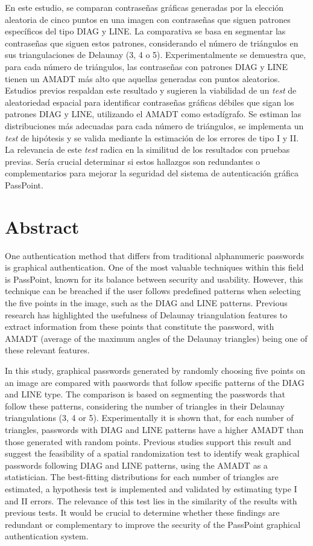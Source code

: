 \documentclass[12pt]{report}
\begin{document}
	En este estudio, se comparan contraseñas gráficas generadas por la elección aleatoria de cinco puntos en una imagen con contraseñas que siguen patrones específicos del tipo DIAG y LINE. La comparativa se basa en segmentar las contraseñas que siguen estos patrones, considerando el número de triángulos en sus triangulaciones de Delaunay (3, 4 o 5). Experimentalmente se demuestra que, para cada número de triángulos, las contraseñas con patrones DIAG y LINE tienen un AMADT más alto que aquellas generadas con puntos aleatorios. Estudios previos respaldan este resultado y sugieren la viabilidad de un \textit{test} de aleatoriedad espacial para identificar contraseñas gráficas débiles que sigan los patrones DIAG y LINE, utilizando el AMADT como estadígrafo. Se estiman las distribuciones más adecuadas para cada número de triángulos, se implementa un \textit{test} de hipótesis y se valida mediante la estimación de los errores de tipo I y II. La relevancia de este \textit{test} radica en la similitud de los resultados con pruebas previas. Sería crucial determinar si estos hallazgos son redundantes o complementarios para mejorar la seguridad del sistema de autenticación gráfica PassPoint.


\chapter*{Abstract}
\hypertarget{Abstract}{}
	
	One authentication method that differs from traditional alphanumeric passwords is graphical authentication. One of the most valuable techniques within this field is PassPoint, known for its balance between security and usability. However, this technique can be breached if the user follows predefined patterns when selecting the five points in the image, such as the DIAG and LINE patterns. Previous research has highlighted the usefulness of Delaunay triangulation features to extract information from these points that constitute the password, with AMADT (average of the maximum angles of the Delaunay triangles) being one of these relevant features.
	
	In this study, graphical passwords generated by randomly choosing five points on an image are compared with passwords that follow specific patterns of the DIAG and LINE type. The comparison is based on segmenting the passwords that follow these patterns, considering the number of triangles in their Delaunay triangulations (3, 4 or 5). Experimentally it is shown that, for each number of triangles, passwords with DIAG and LINE patterns have a higher AMADT than those generated with random points. Previous studies support this result and suggest the feasibility of a spatial randomization test to identify weak graphical passwords following DIAG and LINE patterns, using the AMADT as a statistician. The best-fitting distributions for each number of triangles are estimated, a hypothesis test is implemented and validated by estimating type I and II errors. The relevance of this test lies in the similarity of the results with previous tests. It would be crucial to determine whether these findings are redundant or complementary to improve the security of the PassPoint graphical authentication system.
\end{document}
